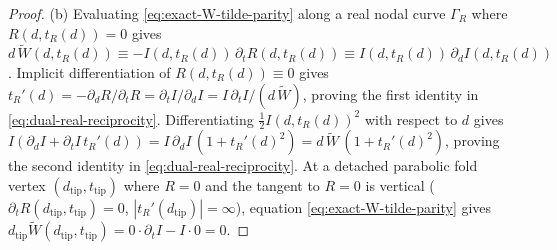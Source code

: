 \documentclass[11pt,reqno]{amsart}
\theoremstyle{definition}
\theoremstyle{remark}
\numberwithin{equation}{section}
\begin{document}
\begin{proof}
(b) Evaluating \eqref{eq:exact-W-tilde-parity} along a real nodal curve $\Gamma_R$ where $R(d,t_R(d)) = 0$ gives $d\,\widetilde{W}(d,t_R(d)) \equiv -I(d,t_R(d))\,\partial_t R(d,t_R(d)) \equiv I(d,t_R(d))\,\partial_d I(d,t_R(d))$. Implicit differentiation of $R(d,t_R(d))\equiv 0$ gives $t_R'(d) = -\partial_d R/\partial_t R = \partial_t I/\partial_d I = I\,\partial_t I/(d\,\widetilde{W})$, proving the first identity in \eqref{eq:dual-real-reciprocity}. Differentiating $\frac{1}{2}I(d,t_R(d))^2$ with respect to $d$ gives $I(\partial_d I + \partial_t I\,t_R'(d)) = I\,\partial_d I\,(1 + t_R'(d)^2) = d\,\widetilde{W}\,(1 + t_R'(d)^2)$, proving the second identity in \eqref{eq:dual-real-reciprocity}. At a detached parabolic fold vertex $(d_{\mathrm{tip}},t_{\mathrm{tip}})$ where $R=0$ and the tangent to $R=0$ is vertical ($\partial_t R(d_{\mathrm{tip}},t_{\mathrm{tip}})=0$, $|t_R'(d_{\mathrm{tip}})|=\infty$), equation \eqref{eq:exact-W-tilde-parity} gives $d_{\mathrm{tip}}\widetilde{W}(d_{\mathrm{tip}},t_{\mathrm{tip}}) = 0\cdot \partial_t I - I\cdot 0 = 0$.
\end{proof}
\end{document}
